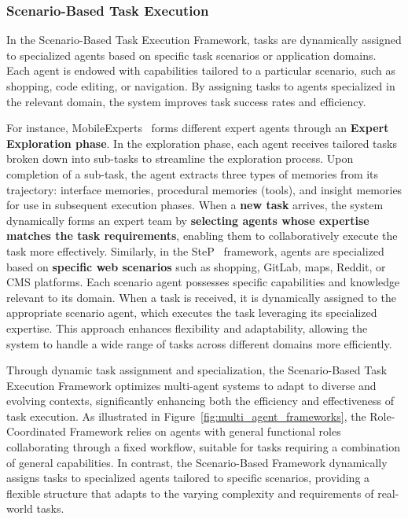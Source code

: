 \subsubsection{Scenario-Based Task Execution}
\label{subsubsec: Scenario-Based Task Execution}

In the Scenario-Based Task Execution Framework, tasks are dynamically assigned to specialized agents based on specific task scenarios or application domains. Each agent is endowed with capabilities tailored to a particular scenario, such as shopping, code editing, or navigation. By assigning tasks to agents specialized in the relevant domain, the system improves task success rates and efficiency.

For instance, MobileExperts~\cite{zhang2024mobileexperts} forms different expert agents through an \textbf{Expert Exploration phase}. In the exploration phase, each agent receives tailored tasks broken down into sub-tasks to streamline the exploration process. Upon completion of a sub-task, the agent extracts three types of memories from its trajectory: interface memories, procedural memories (tools), and insight memories for use in subsequent execution phases. When a \textbf{new task} arrives, the system dynamically forms an expert team by \textbf{selecting agents whose expertise matches the task requirements}, enabling them to collaboratively execute the task more effectively. Similarly, in the SteP~\cite{sodhi2024step} framework, agents are specialized based on \textbf{specific web scenarios} such as shopping, GitLab, maps, Reddit, or CMS platforms. Each scenario agent possesses specific capabilities and knowledge relevant to its domain. When a task is received, it is dynamically assigned to the appropriate scenario agent, which executes the task leveraging its specialized expertise. This approach enhances flexibility and adaptability, allowing the system to handle a wide range of tasks across different domains more efficiently.

Through dynamic task assignment and specialization, the Scenario-Based Task Execution Framework optimizes multi-agent systems to adapt to diverse and evolving contexts, significantly enhancing both the efficiency and effectiveness of task execution. As illustrated in Figure~\ref{fig:multi_agent_frameworks}, the Role-Coordinated Framework relies on agents with general functional roles collaborating through a fixed workflow, suitable for tasks requiring a combination of general capabilities. In contrast, the Scenario-Based Framework dynamically assigns tasks to specialized agents tailored to specific scenarios, providing a flexible structure that adapts to the varying complexity and requirements of real-world tasks.


